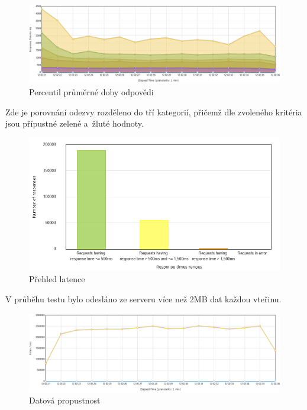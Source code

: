 \begin{figure}[htbp]
    \centering
        \includegraphics[scale=.34]{obrazky-figures/testing/performance/perun/flotResponseTimePercentilesOverTime.png}
        \caption{Percentil průměrné doby odpovědi}
        \label{fig:percentil-response-perun}
\end{figure}

\noindent
Zde je porovnání odezvy rozděleno do tří kategorií, přičemž dle zvoleného kritéria jsou přípustné zelené a~žluté hodnoty.

\begin{figure}[htbp]
    \centering
        \includegraphics[scale=.55]{obrazky-figures/testing/performance/perun/responseTimeOverview.png}
        \caption{Přehled latence}
\end{figure}
\newpage
\noindent
V průběhu testu bylo odesláno ze serveru více než 2MB dat každou vteřinu. 
\begin{figure}[htbp]
    \centering
        \includegraphics[scale=.34]{obrazky-figures/testing/performance/perun/flotBytesThroughputOverTime.png}
        \caption{Datová propustnost}
\end{figure}

